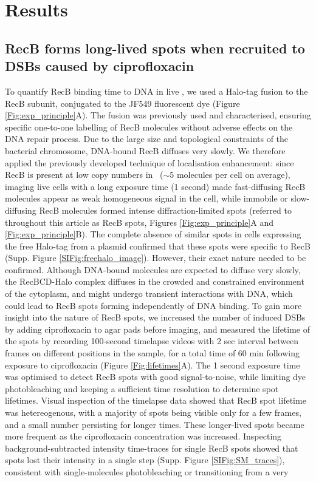 \section*{Results}

\subsection*{RecB forms long-lived spots when recruited to DSBs caused by cipro\-floxacin}
To quantify RecB binding time to DNA in live \ecoli, we used a Halo-tag fusion to the RecB subunit, conjugated to the JF549 fluorescent dye (Figure \ref{Fig:exp_principle}A). The fusion was previously used and characterised, ensuring specific one-to-one labelling of RecB molecules without adverse effects on the DNA repair process\cite{Lepore2019a,Lepore2023}. Due to the large size and topological constraints of the bacterial chromosome, DNA-bound RecB diffuses very slowly\cite{Lepore2023}. We therefore applied the previously developed technique of localisation enhancement\cite{Yu2006, Elf2007}: since RecB is present at low copy numbers in \ecoli\ ($\sim$5 molecules per cell on average\cite{Lepore2019a}), imaging live cells with a long exposure time (1 second) made fast-diffusing RecB molecules appear as weak homogeneous signal in the cell, while immobile or slow-diffusing RecB molecules formed intense diffraction-limited spots (referred to throughout this article as RecB spots, Figures \ref{Fig:exp_principle}A and \ref{Fig:exp_principle}B). The complete absence of similar spots in cells expressing the free Halo-tag from a plasmid confirmed that these spots were specific to RecB (Supp. Figure \ref{SIFig:freehalo_image}). However, their exact nature needed to be confirmed. Although DNA-bound molecules are expected to diffuse very slowly, the RecBCD-Halo complex diffuses in the crowded and constrained environment of the cytoplasm, and might undergo transient interactions with DNA\cite{Lepore2023}, which could lead to RecB spots forming independently of DNA binding. To gain more insight into the nature of RecB spots, we increased the number of induced DSBs by adding ciprofloxacin to agar pads before imaging, and measured the lifetime of the spots by recording 100-second timelapse videos with 2 sec interval between frames on different positions in the sample, for a total time of 60 min following exposure to ciprofloxacin (Figure \ref{Fig:lifetimes}A). The 1 second exposure time was optimised to detect RecB spots with good signal-to-noise, while limiting dye photobleaching and keeping a sufficient time resolution to determine spot lifetimes. Visual inspection of the timelapse data showed that RecB spot lifetime was hetereogenous, with a majority of spots being visible only for a few frames, and a small number persisting for longer times. These longer-lived spots became more frequent as the ciprofloxacin concentration was increased. Inspecting background-subtracted intensity time-traces for single RecB spots showed that spots lost their intensity in a single step (Supp. Figure \ref{SIFig:SM_traces}), consistent with single-molecules photobleaching or transitioning from a very 